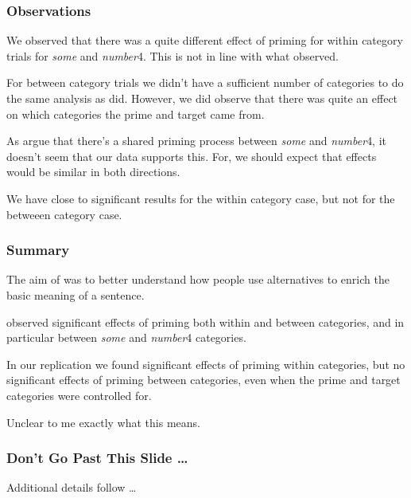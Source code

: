 \documentclass[noamssymb]{beamer}
\begin{document}
\begin{frame}
  \frametitle{{\ftf Observations}}
  We observed that there was a quite different effect of priming for within category trials for \emph{some} and \emph{number}4.
  This is not in line with what \citeauthor{Bott:2016aa} observed.

  For between category trials we didn't have a sufficient number of categories to do the same analysis as \citeauthor{Bott:2016aa} did.
  However, we did observe that there was quite an effect on which categories the prime and target came from.

  As \citeauthor{Bott:2016aa} argue that there's a shared priming process between \emph{some} and \emph{number}4, it doesn't seem that our data supports this.
  For, we should expect that effects would be similar in both directions.

  We have close to significant results for the within category case, but not for the betweeen category case.

\end{frame}


\begin{frame}
  \frametitle{{\ftf Summary}}

  The aim of \textcite{Bott:2016aa} was to better understand how people use alternatives to enrich the basic meaning of a sentence.

  \citeauthor{Bott:2016aa} observed significant effects of priming both within and between categories, and in particular between \emph{some} and \emph{number}4 categories.

  In our replication we found significant effects of priming within categories, but no significant effects of priming between categories, even when the prime and target categories were controlled for.

  Unclear to me exactly what this means.

\end{frame}


\appendix


\begin{frame}
  \frametitle{{\ftf Don't Go Past This Slide \dots}}

  Additional details follow \dots
\end{frame}
\end{document}
